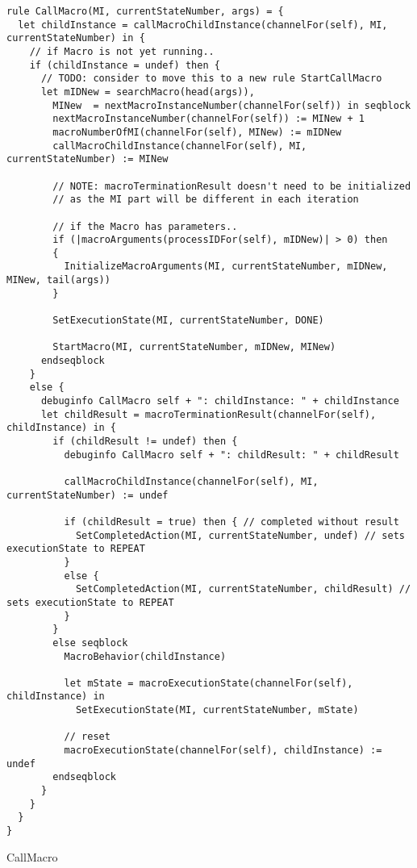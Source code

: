\begin{listing}[H]
\begin{verbatim}
rule CallMacro(MI, currentStateNumber, args) = {
  let childInstance = callMacroChildInstance(channelFor(self), MI, currentStateNumber) in {
    // if Macro is not yet running..
    if (childInstance = undef) then {
      // TODO: consider to move this to a new rule StartCallMacro
      let mIDNew = searchMacro(head(args)),
        MINew  = nextMacroInstanceNumber(channelFor(self)) in seqblock
        nextMacroInstanceNumber(channelFor(self)) := MINew + 1
        macroNumberOfMI(channelFor(self), MINew) := mIDNew
        callMacroChildInstance(channelFor(self), MI, currentStateNumber) := MINew

        // NOTE: macroTerminationResult doesn't need to be initialized
        // as the MI part will be different in each iteration

        // if the Macro has parameters..
        if (|macroArguments(processIDFor(self), mIDNew)| > 0) then
        {
          InitializeMacroArguments(MI, currentStateNumber, mIDNew, MINew, tail(args))
        }

        SetExecutionState(MI, currentStateNumber, DONE)

        StartMacro(MI, currentStateNumber, mIDNew, MINew)
      endseqblock
    }
    else {
      debuginfo CallMacro self + ": childInstance: " + childInstance
      let childResult = macroTerminationResult(channelFor(self), childInstance) in {
        if (childResult != undef) then {
          debuginfo CallMacro self + ": childResult: " + childResult

          callMacroChildInstance(channelFor(self), MI, currentStateNumber) := undef

          if (childResult = true) then { // completed without result
            SetCompletedAction(MI, currentStateNumber, undef) // sets executionState to REPEAT
          }
          else {
            SetCompletedAction(MI, currentStateNumber, childResult) // sets executionState to REPEAT
          }
        }
        else seqblock
          MacroBehavior(childInstance)

          let mState = macroExecutionState(channelFor(self), childInstance) in
            SetExecutionState(MI, currentStateNumber, mState)

          // reset
          macroExecutionState(channelFor(self), childInstance) := undef
        endseqblock
      }
    }
  }
}
\end{verbatim}
\caption{CallMacro}
\label{lst:asm:CallMacro}
\end{listing}




